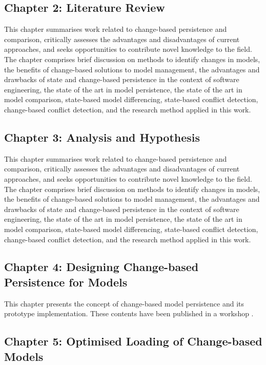 \subsection{Chapter 2: Literature Review}
\label{sec:chapter_2_literature_review_plan}
This chapter summarises work related to change-based persistence and comparison, critically assesses the advantages and disadvantages of current approaches, and seeks opportunities to contribute novel knowledge to the field. The chapter comprises brief discussion on methods to identify changes in models, the benefits of change-based solutions to model management, the advantages and drawbacks of state and change-based persistence in the context of software engineering, the state of the art in model persistence, the state of the art in model comparison, state-based model differencing, state-based conflict detection, change-based conflict detection, and the research method applied in this work.

\subsection{Chapter 3: Analysis and Hypothesis}
\label{sec:ch:analysis_and_hypothesis}
This chapter summarises work related to change-based persistence and comparison, critically assesses the advantages and disadvantages of current approaches, and seeks opportunities to contribute novel knowledge to the field. The chapter comprises brief discussion on methods to identify changes in models, the benefits of change-based solutions to model management, the advantages and drawbacks of state and change-based persistence in the context of software engineering, the state of the art in model persistence, the state of the art in model comparison, state-based model differencing, state-based conflict detection, change-based conflict detection, and the research method applied in this work.

\subsection{Chapter 4: Designing Change-based Persistence for Models}
\label{sec:chapter_3_Change-based_model_ersistence_plan}
This chapter presents the concept of change-based model persistence and its prototype implementation. These contents have been published in a workshop \cite{DBLP:conf/models/YohannisKP17}.

\subsection{Chapter 5: Optimised Loading of Change-based Models}
\label{sec:chapter_4_optimised_loading_change_based_model_persistence}

